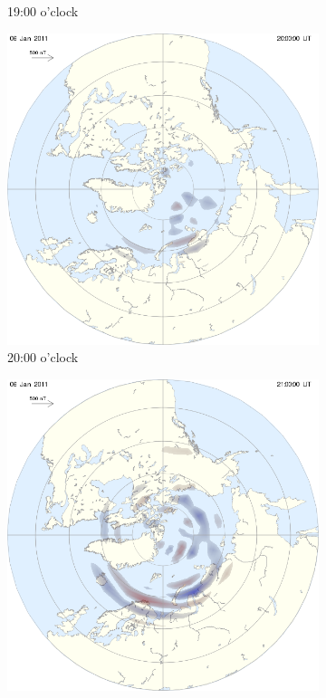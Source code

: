 \documentclass[10pt,a4paper]{article}
\begin{document}
\begin{figure}[h]
\begin{subfigure}{0.3\textwidth}
	\caption{19:00 o'clock \label{amp19}}
\end{subfigure}
\begin{subfigure}{0.3\textwidth}
\centering
	\includegraphics[width=\textwidth]{ampere2.png}
	\caption{ 20:00 o'clock \label{amp20}}
\end{subfigure}
\begin{subfigure}{0.3\textwidth}
\centering
	\includegraphics[width=\textwidth]{ampere3.png}

\end{subfigure}
\end{figure}
\end{document}
